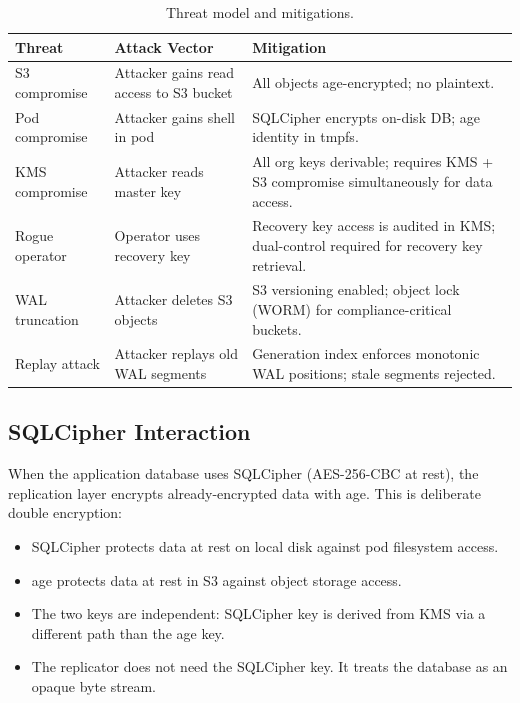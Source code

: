 \begin{table}[H]
\centering
\caption{Threat model and mitigations.}
\label{tab:threats}
\begin{tabular}{@{}lp{4cm}p{5cm}@{}}
\toprule
\textbf{Threat} & \textbf{Attack Vector} & \textbf{Mitigation} \\
\midrule
S3 compromise & Attacker gains read access to S3 bucket &
  All objects age-encrypted; no plaintext. \\
Pod compromise & Attacker gains shell in pod &
  SQLCipher encrypts on-disk DB; age identity in tmpfs. \\
KMS compromise & Attacker reads master key &
  All org keys derivable; requires KMS + S3 compromise
  simultaneously for data access. \\
Rogue operator & Operator uses recovery key &
  Recovery key access is audited in KMS; dual-control
  required for recovery key retrieval. \\
WAL truncation & Attacker deletes S3 objects &
  S3 versioning enabled; object lock (WORM) for
  compliance-critical buckets. \\
Replay attack & Attacker replays old WAL segments &
  Generation index enforces monotonic WAL positions;
  stale segments rejected. \\
\bottomrule
\end{tabular}
\end{table}

\subsection{SQLCipher Interaction}

When the application database uses SQLCipher (AES-256-CBC at rest),
the replication layer encrypts already-encrypted data with age. This
is deliberate double encryption:

\begin{itemize}[nosep]
  \item SQLCipher protects data at rest on local disk against pod
    filesystem access.
  \item age protects data at rest in S3 against object storage access.
  \item The two keys are independent: SQLCipher key is derived from
    KMS via a different path than the age key.
  \item The replicator does not need the SQLCipher key. It treats the
    database as an opaque byte stream.
\end{itemize}

